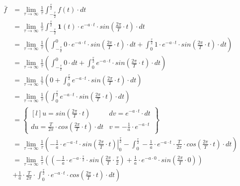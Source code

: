 \begin{align*}
\bar{f} &=\lim_{\tau \rightarrow \infty }\frac{1}{\tau}\int_{-\frac{\tau}{2}}^{\frac{\tau}{2}}f(t) \cdot dt\\
 &=\lim_{\tau \rightarrow \infty }\frac{1}{\tau}\int_{-\frac{\tau}{2}}^{\frac{\tau}{2}} \mathbf{1}(t)\cdot e^{-a\cdot t}\cdot sin\left(\frac{2\pi}{T}\cdot t \right) \cdot dt\\
 &=\lim_{\tau \rightarrow \infty }\frac{1}{\tau}\left(
 \int_{-\frac{\tau}{2}}^{0} 0 \cdot e^{-a\cdot t}\cdot sin\left(\frac{2\pi}{T}\cdot t \right) \cdot dt +
 \int_{0}^{\frac{\tau}{2}} 1 \cdot e^{-a\cdot t}\cdot sin\left(\frac{2\pi}{T}\cdot t \right) \cdot dt \right)\\
 &=\lim_{\tau \rightarrow \infty }\frac{1}{\tau}\left(
 \int_{-\frac{\tau}{2}}^{0} 0 \cdot dt +
 \int_{0}^{\frac{\tau}{2}} e^{-a\cdot t}\cdot sin\left(\frac{2\pi}{T}\cdot t \right) \cdot dt \right)\\
 &=\lim_{\tau \rightarrow \infty }\frac{1}{\tau}\left(
 0 +
 \int_{0}^{\frac{\tau}{2}} e^{-a\cdot t}\cdot sin\left(\frac{2\pi}{T}\cdot t \right) \cdot dt \right)\\
 &=\lim_{\tau \rightarrow \infty }\frac{1}{\tau}\left(
 \int_{0}^{\frac{\tau}{2}} e^{-a\cdot t}\cdot sin\left(\frac{2\pi}{T}\cdot t \right) \cdot dt \right)\\
 &=\begin{Bmatrix*}[l]
 u=sin(\frac{2\pi}{T}\cdot t) & dv = e^{-a \cdot t}\cdot dt\\ 
 du=\frac{T}{2\pi} \cdot cos(\frac{2\pi}{T}\cdot t)\cdot dt & v=-\frac{1}{a}\cdot e^{-a\cdot t}
 \end{Bmatrix*}\\
 &=\lim_{\tau \rightarrow \infty }\frac{1}{\tau}\left(
 \left. -\frac{1}{a}\cdot e^{-a\cdot t} \cdot sin \left(\frac{2\pi}{T}\cdot t\right) \right|_{0}^{\frac{\tau}{2}}
 -\int_{0}^{\frac{\tau}{2}} -\frac{1}{a}\cdot e^{-a\cdot t} \cdot \frac{T}{2\pi} \cdot cos\left(\frac{2\pi}{T}\cdot t\right)\cdot dt
 \right)\\
 &=\lim_{\tau \rightarrow \infty }\frac{1}{\tau}\left(
 \left( -\frac{1}{a}\cdot e^{-a\cdot \frac{\tau}{2}} \cdot sin \left(\frac{2\pi}{T}\cdot \frac{\tau}{2}\right) + \frac{1}{a}\cdot e^{-a\cdot 0} \cdot sin \left(\frac{2\pi}{T}\cdot 0\right) \right)\right.\\
 &\left.+\frac{1}{a} \cdot \frac{T}{2\pi} \cdot \int_{0}^{\frac{\tau}{2}} \cdot e^{-a\cdot t} \cdot cos\left(\frac{2\pi}{T}\cdot t\right)\cdot dt \right)\\

\end{align*}
